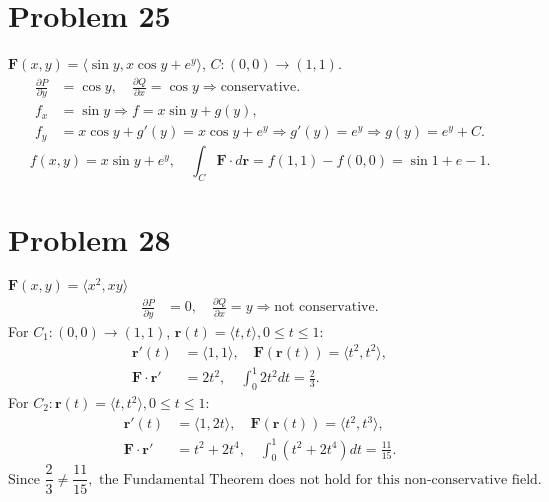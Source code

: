 \documentclass[12pt]{memoir}
\begin{document}
\section*{Problem 25}
$\mathbf{F}(x, y) = \langle \sin y, x \cos y + e^y \rangle$, $C: (0,0) \to (1,1)$.  
\begin{align*}
\frac{\partial P}{\partial y} &= \cos y, \quad \frac{\partial Q}{\partial x} = \cos y \Rightarrow \text{conservative.}\\
f_x &= \sin y \Rightarrow f = x \sin y + g(y), \\
f_y &= x \cos y + g'(y) = x \cos y + e^y \Rightarrow g'(y) = e^y \Rightarrow g(y) = e^y + C.
\end{align*}
\begin{equation*}
f(x, y) = x \sin y + e^y, \quad \int_C \mathbf{F} \cdot d\mathbf{r} = f(1,1) - f(0,0) = \sin 1 + e - 1.
\end{equation*}

\section*{Problem 28}
$\mathbf{F}(x, y) = \langle x^2, xy \rangle$  
\begin{align*}
\frac{\partial P}{\partial y} &= 0, \quad \frac{\partial Q}{\partial x} = y \Rightarrow \text{not conservative.}
\end{align*}
For $C_1: (0,0) \to (1,1)$, $\mathbf{r}(t)=\langle t,t\rangle, 0\le t\le1$:
\begin{align*}
\mathbf{r}'(t) &= \langle 1,1\rangle, \quad \mathbf{F}(\mathbf{r}(t)) = \langle t^2,t^2\rangle, \\
\mathbf{F}\cdot \mathbf{r}' &= 2t^2, \quad \int_0^1 2t^2 dt = \frac{2}{3}.
\end{align*}
For $C_2: \mathbf{r}(t)=\langle t,t^2\rangle, 0\le t\le1$:
\begin{align*}
\mathbf{r}'(t) &= \langle 1,2t\rangle, \quad \mathbf{F}(\mathbf{r}(t)) = \langle t^2,t^3\rangle, \\
\mathbf{F}\cdot \mathbf{r}' &= t^2 + 2t^4, \quad \int_0^1 (t^2 + 2t^4)dt = \frac{11}{15}.
\end{align*}
\begin{equation*}
\text{Since } \frac{2}{3} \ne \frac{11}{15}, \text{ the Fundamental Theorem does not hold for this non-conservative field.}
\end{equation*}
\end{document}
